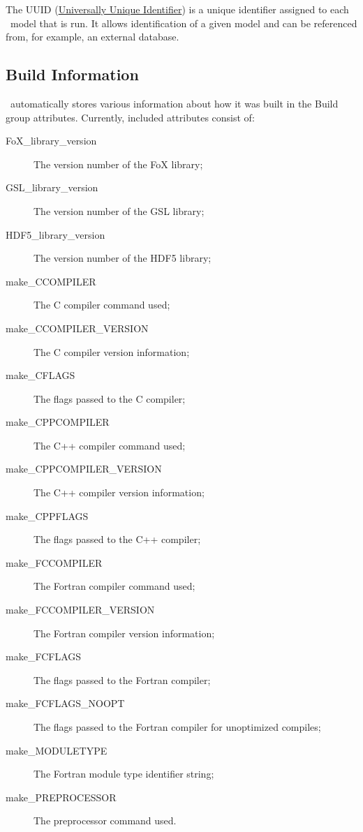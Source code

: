 The UUID (\href{https://secure.wikimedia.org/wikipedia/en/wiki/Universally_unique_identifier}{Universally Unique Identifier}) is a unique identifier assigned to each \glc\ model that is run. It allows identification of a given model and can be referenced from, for example, an external database.

\subsection{Build Information}\label{sec:BuildInformation}

\glc\ automatically stores various information about how it was built in the {\normalfont \ttfamily Build} group attributes. Currently, included attributes consist of:
\begin{description}
\item[{\normalfont \ttfamily FoX\_library\_version}] The version number of the FoX library;
\item[{\normalfont \ttfamily GSL\_library\_version}] The version number of the GSL library;
\item[{\normalfont \ttfamily HDF5\_library\_version}] The version number of the HDF5 library;
\item[{\normalfont \ttfamily make\_CCOMPILER}] The C compiler command used;
\item[{\normalfont \ttfamily make\_CCOMPILER\_VERSION}] The C compiler version information;
\item[{\normalfont \ttfamily make\_CFLAGS}] The flags passed to the C compiler;
\item[{\normalfont \ttfamily make\_CPPCOMPILER}] The C++ compiler command used;
\item[{\normalfont \ttfamily make\_CPPCOMPILER\_VERSION}] The C++ compiler version information;
\item[{\normalfont \ttfamily make\_CPPFLAGS}] The flags passed to the C++ compiler;
\item[{\normalfont \ttfamily make\_FCCOMPILER}] The Fortran compiler command used;
\item[{\normalfont \ttfamily make\_FCCOMPILER\_VERSION}] The Fortran compiler version information;
\item[{\normalfont \ttfamily make\_FCFLAGS}] The flags passed to the Fortran compiler;
\item[{\normalfont \ttfamily make\_FCFLAGS\_NOOPT}] The flags passed to the Fortran compiler for unoptimized compiles;
\item[{\normalfont \ttfamily make\_MODULETYPE}] The Fortran module type identifier string;
\item[{\normalfont \ttfamily make\_PREPROCESSOR}] The preprocessor command used.
\end{description}

